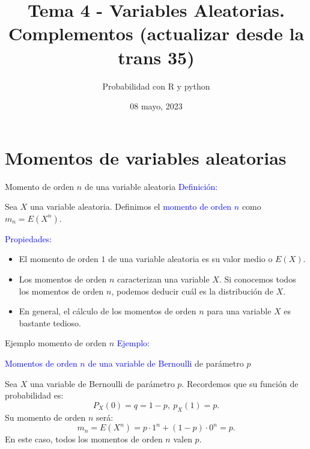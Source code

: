 \documentclass[
  ignorenonframetext,
  aspectratio=169]{beamer}
\title{Tema 4 - Variables Aleatorias. Complementos (actualizar desde la
trans 35)}
\author{Probabilidad con R y python}
\date{08 mayo, 2023}
\newcommand\blue[1]{\textcolor{blue}{#1}}
\begin{document}
\frame{\titlepage}

\begin{frame}[allowframebreaks]
  \tableofcontents[hideallsubsections]
\end{frame}
\begin{frame}
\newcommand\momento{m}
\newcommand{\momentocentral}{\mu}
\newcommand{\FunGenMom}{m}
\newcommand{\FunCar}{\phi}
\newcommand{\Entropia}{H}
\end{frame}

\hypertarget{momentos-de-variables-aleatorias}{%
\section{Momentos de variables
aleatorias}\label{momentos-de-variables-aleatorias}}

\begin{frame}{Momento de orden \(n\) de una variable aleatoria}
\protect\hypertarget{momento-de-orden-n-de-una-variable-aleatoria}{}
\blue{Definición:}

Sea \(X\) una variable aleatoria. Definimos el
\blue{momento de orden $n$} como \(m_n = E\left(X^n\right)\).

\blue{Propiedades:}

\begin{itemize}
\item
  El momento de orden \(1\) de una variable aleatoria es su valor medio
  o \(E(X)\).
\item
  Los momentos de orden \(n\) caracterizan una variable \(X\). Si
  conocemos todos los momentos de orden \(n\), podemos deducir cuál es
  la distribución de \(X\).
\item
  En general, el cálculo de los momentos de orden \(n\) para una
  variable \(X\) es bastante tedioso.
\end{itemize}
\end{frame}

\begin{frame}{Ejemplo momento de orden \(n\)}
\protect\hypertarget{ejemplo-momento-de-orden-n}{}
\blue{Ejemplo:}

\blue{Momentos de orden $n$ de una variable de Bernoulli} de parámetro
\(p\)

Sea \(X\) una variable de Bernoulli de parámetro \(p\). Recordemos que
su función de probabilidad es: \[
P_X(0)=q=1-p,\ p_X(1)=p.
\] Su momento de orden \(n\) será: \[
m_n = E\left(X^n\right)=p\cdot 1^n+(1-p)\cdot 0^n = p.
\] En este caso, todos los momentos de orden \(n\) valen \(p\).
\end{frame}
\end{document}
